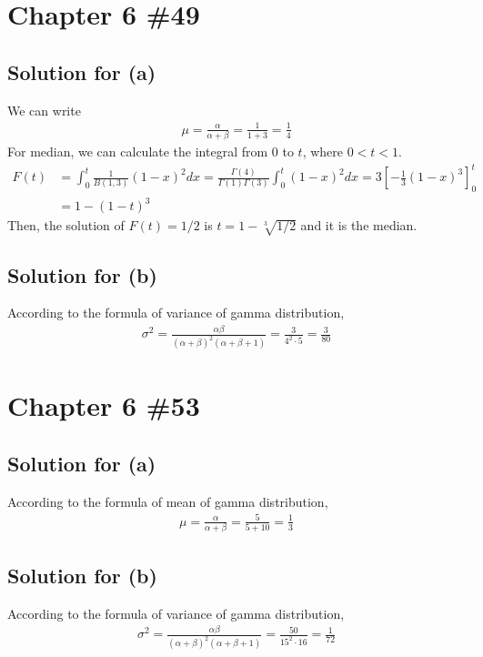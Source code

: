 \documentclass{scrartcl}
\begin{document}
\section{Chapter 6 \#49}
\subsection{Solution for (a)}
We can write
\begin{align*}
  \mu = \frac{\alpha}{\alpha + \beta} = \frac{1}{1 + 3} = \frac{1}{4}
\end{align*}
For median, we can calculate the integral from 0 to \(t\), where \(0 < t < 1\).
\begin{align*}
  F(t)
  &= \int^t_0 \frac{1}{B(1, 3)} (1 - x)^2 dx
  = \frac{\Gamma(4)}{\Gamma(1) \Gamma(3)} \int^t_0 (1 - x)^2 dx
  = 3 \left[ -\frac{1}{3} (1 - x)^3 \right]^t_0 \\
  &= 1 - (1 - t)^3
\end{align*}
Then, the solution of \(F(t) = 1/2\) is \(t = 1 - \sqrt[3]{1/2}\) and it is the
median.

\subsection{Solution for (b)}
According to the formula of variance of gamma distribution,
\begin{align*}
  \sigma^2
  = \frac{\alpha \beta}{(\alpha + \beta)^2 (\alpha + \beta + 1)}
  = \frac{3}{4^2 \cdot 5}
  = \frac{3}{80}
\end{align*}

\section{Chapter 6 \#53}
\subsection{Solution for (a)}
According to the formula of mean of gamma distribution,
\begin{align*}
  \mu
  = \frac{\alpha}{\alpha + \beta}
  = \frac{5}{5 + 10}
  = \frac{1}{3}
\end{align*}

\subsection{Solution for (b)}
According to the formula of variance of gamma distribution,
\begin{align*}
  \sigma^2
  = \frac{\alpha \beta}{(\alpha + \beta)^2 (\alpha + \beta + 1)}
  = \frac{50}{15^2 \cdot 16}
  = \frac{1}{72}
\end{align*}
\end{document}
